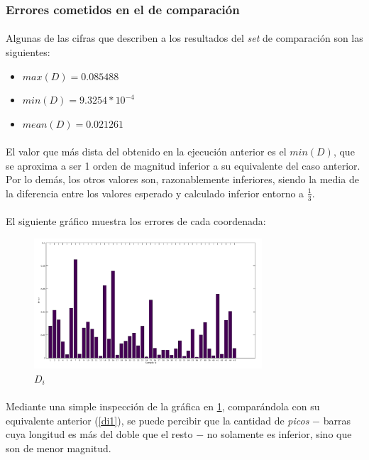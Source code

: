 \documentclass[12pt, twocolumn]{article}
\begin{document}
	\subsubsection{Errores cometidos en el  de comparación}
	
	\paragraph{} Algunas de las cifras que describen a los resultados del \textit{set} de comparación son las siguientes:
	
	\begin{itemize}
		\item $max(D) = 0.085488$
		\item $min(D) = 9.3254*10^{-4}$
		\item $mean(D) = 0.021261$
	\end{itemize}
	
	\paragraph{} El valor que más dista del obtenido en la ejecución anterior es el $min(D)$, que se aproxima a ser 1 orden de magnitud inferior a su equivalente del caso anterior. Por lo demás, los otros valores son, razonablemente inferiores, siendo la media de la diferencia entre los valores esperado y calculado inferior entorno a $\frac{1}{3}$. 
	
	\paragraph{} El siguiente gráfico muestra los errores de cada coordenada:
	
	\begin{figure}[H]
		\centering
		\includegraphics[width=8.5cm]{../results/batch_momentum/2/bar_batch.png}
		\caption{$D_i$}
		\label{di2}
	\end{figure}
	
	\paragraph{} Mediante una simple inspección de la gráfica en \ref{di2}, comparándola con su equivalente anterior (\ref{di1}), se puede percibir que la cantidad de \textit{picos} $-$ barras cuya longitud es más del doble que el resto $-$ no solamente es inferior, sino que son de menor magnitud. 
	
\end{document}
